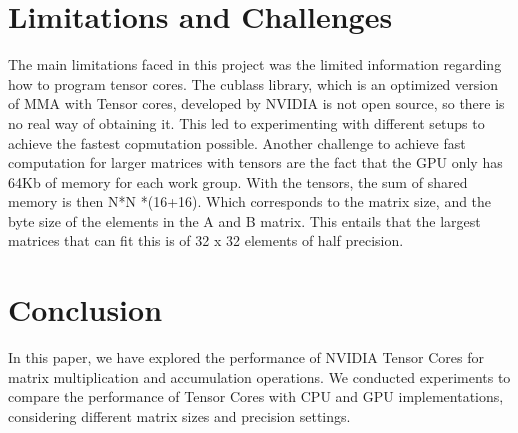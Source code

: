 \documentclass[conference]{IEEEtran}
\begin{document}
  \section{Limitations and Challenges}\label{sec:limitations-challenges}
  The main limitations faced in this project was the limited information regarding how to program tensor cores.
  The cublass library, which is an optimized version of MMA with Tensor cores, developed by NVIDIA is not open source,
  so there is no real way of obtaining it. This led to experimenting with different setups to achieve the fastest copmutation possible.
  Another challenge to achieve fast computation for larger matrices with tensors are the fact that the GPU 
  only has 64Kb of memory for each work group. With the tensors, the sum of shared memory is then N*N *(16+16).
  Which corresponds to the matrix size, and the byte size of the elements in the A and B matrix. This entails that the 
  largest matrices that can fit this is of 32 x 32 elements of half precision.


  \section{Conclusion}\label{sec:conclusion}
  
  In this paper, we have explored the performance of NVIDIA Tensor Cores for matrix multiplication and accumulation operations. 
  We conducted experiments to compare the performance of Tensor Cores with CPU and GPU implementations, 
  considering different matrix sizes and precision settings.
  



\end{document}
